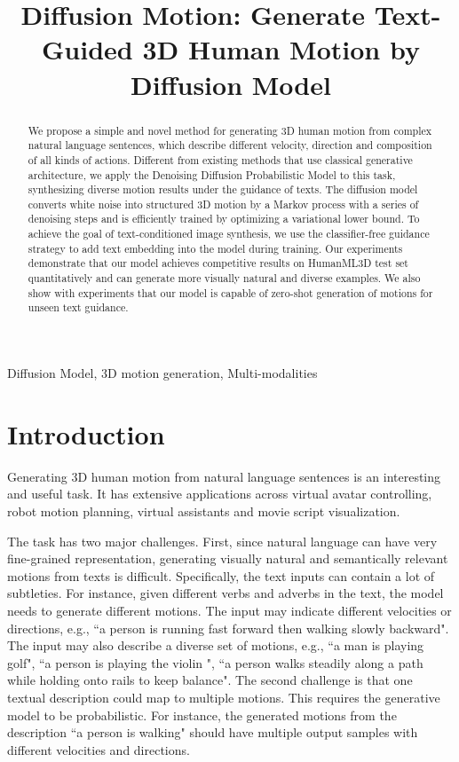 \documentclass{article}
\title{Diffusion Motion: Generate Text-Guided 3D Human Motion by Diffusion Model}
\begin{document}
\maketitle
\begin{abstract}
    We propose a simple and novel method for generating 3D human motion from complex natural language sentences, which describe different velocity, direction and composition of all kinds of actions. Different from existing methods that use classical generative architecture, we apply the Denoising Diffusion Probabilistic Model to this task, synthesizing diverse motion results under the guidance of texts. The diffusion model converts white noise into structured 3D motion by a Markov process with a series of denoising steps and is efficiently trained by optimizing a variational lower bound. To achieve the goal of text-conditioned image synthesis, we use the classifier-free guidance strategy to add text embedding into the model during training.  Our experiments demonstrate that our model achieves competitive results on HumanML3D test set quantitatively and can generate more visually natural and diverse examples. We also show with experiments that our model is capable of zero-shot generation of motions for unseen text guidance. 
\end{abstract}

\begin{keywords}
Diffusion Model, 3D motion generation, Multi-modalities
\end{keywords}
\section{Introduction}

Generating 3D human motion from natural language sentences is an interesting and useful task. It has extensive  applications across virtual avatar controlling, robot motion planning,  virtual assistants and movie script visualization. 

The task has two major challenges. First, since natural language can have very fine-grained representation, generating visually natural and semantically relevant motions from texts is difficult. Specifically, the text inputs can contain a lot of subtleties. For instance, given different verbs and adverbs in the text, the model needs to generate different 
motions. The input may indicate different velocities or directions, e.g., ``a person is running fast forward then walking slowly backward". The input may also describe a diverse set of motions, e.g., ``a man is playing golf", ``a person is playing the violin ", ``a person walks steadily along a path while holding onto rails to keep balance". The second challenge is that one textual description could 
map to multiple motions. This requires the generative model to be probabilistic. For instance, the generated motions from the description ``a person is walking" should have multiple output samples with different velocities and directions.
\end{document}
